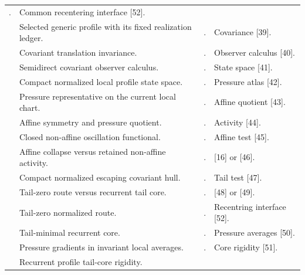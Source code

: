 \documentclass[11pt]{amsart}
\numberwithin{equation}{section}
\theoremstyle{plain}
\theoremstyle{definition}
\theoremstyle{remark}
\begin{document}
\begin{longtable}{@{}L{0.06\textwidth}L{0.25\textwidth}L{0.40\textwidth}L{0.21\textwidth}@{}}
. & Common recentering interface [52].\\
\relax
[38] & Selected generic profile with its fixed realization ledger. &
. & Covariance [39].\\
\relax
[39] & Covariant translation invariance. &
. & Observer calculus [40].\\
\relax
[40] & Semidirect covariant observer calculus. &
. & State space [41].\\
\relax
[41] & Compact normalized local profile state space. &
. & Pressure atlas [42].\\
\relax
[42] & Pressure representative on the current local chart. &
. & Affine quotient [43].\\
\relax
[43] & Affine symmetry and pressure quotient. &
. & Activity [44].\\
\relax
[44] & Closed non-affine oscillation functional. &
. & Affine test [45].\\
\relax
[45] & Affine collapse versus retained non-affine activity. &
. & [16] or [46].\\
\relax
[46] & Compact normalized escaping covariant hull. &
. & Tail test [47].\\
\relax
[47] & Tail-zero route versus recurrent tail core. &
. & [48] or [49].\\
\relax
[48] & Tail-zero normalized route. &
. & Recentring interface [52].\\
\relax
[49] & Tail-minimal recurrent core. &
. & Pressure averages [50].\\
\relax
[50] & Pressure gradients in invariant local averages. &
. & Core rigidity [51].\\
\relax
[51] & Recurrent profile tail-core rigidity. &

\end{longtable}
\end{document}
